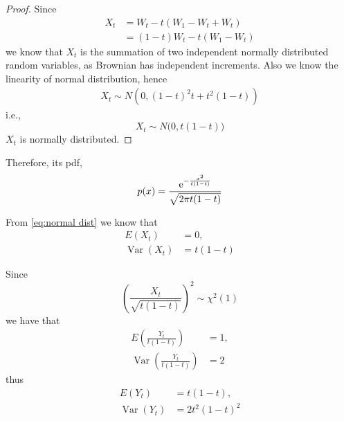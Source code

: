 \documentclass{homework}
\DeclareMathOperator{\Var}{Var}
\begin{document}
    \problem
    \begin{subproblem}
        \item
        \begin{proof}
            Since
            \[\begin{aligned}
                X_t&=W_t-t(W_1-W_t+W_t)\\
                   &=(1-t)W_t-t(W_1-W_t) 
            \end{aligned}\]
            we know that $X_t$ is the summation of two
            independent normally distributed random variables,
            as Brownian has independent increments. Also we know
            the linearity of normal distribution, hence
            \begin{equation}
                \label{eq:normal dist}
                \begin{aligned}
                X_t\sim N\left(0,(1-t)^2t+t^2(1-t)\right)
                \end{aligned}
            \end{equation}
            i.e.,
            \[X_t\sim N\big(0,t(1-t)\big)\]
            $X_t$ is normally distributed.
        \end{proof}

        Therefore, its pdf,
        \[p(x)=\frac{\mathrm e^{-\frac{x^2}{t(1-t)}}}{\sqrt{2\pi t(1-t)}}\]

        \item
        From \cref{eq:normal dist} we know that
        \begin{align*}
            E(X_t)&=0,\\
            \Var(X_t)&=t(1-t)
        \end{align*}

        \item
        Since
        \[\left(\frac{X_t}{\sqrt{t(1-t)}}\right)^2\sim\chi^2(1)\]
        we have that
        \begin{align*}
            E\left(\frac{Y_t}{t(1-t)}\right)&=1,\\
            \Var\left(\frac{Y_t}{t(1-t)}\right)&=2
        \end{align*}
        thus
        \begin{align*}
            E(Y_t)&=t(1-t),\\
            \Var(Y_t)&=2t^2(1-t)^2
        \end{align*}
    \end{subproblem}
\end{document}
